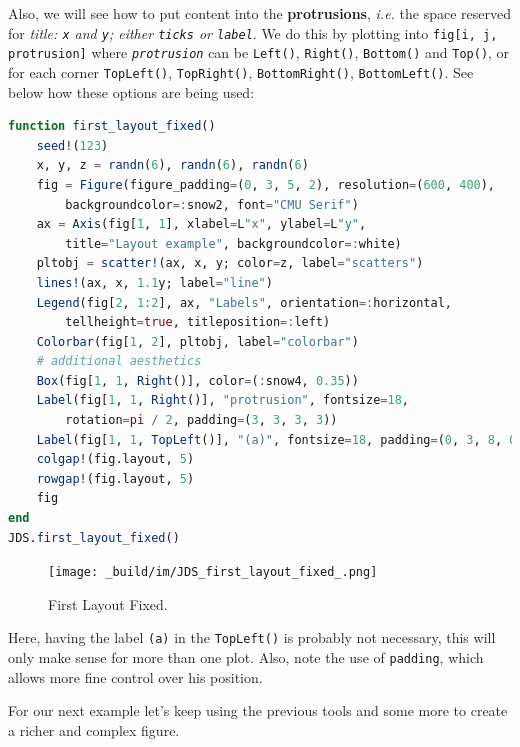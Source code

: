 \documentclass[
  notoc %
]{tufte-book}
\newcommand{\passthrough}[1]{#1}
\begin{document}
Also, we will see how to put content into the \textbf{protrusions},
\emph{i.e.} the space reserved for \emph{title:
\passthrough{\lstinline!x!} and \passthrough{\lstinline!y!}; either
\passthrough{\lstinline!ticks!} or \passthrough{\lstinline!label!}}. We
do this by plotting into \passthrough{\lstinline!fig[i, j, protrusion]!}
where \emph{\passthrough{\lstinline!protrusion!}} can be
\passthrough{\lstinline!Left()!}, \passthrough{\lstinline!Right()!},
\passthrough{\lstinline!Bottom()!} and \passthrough{\lstinline!Top()!},
or for each corner \passthrough{\lstinline!TopLeft()!},
\passthrough{\lstinline!TopRight()!},
\passthrough{\lstinline!BottomRight()!},
\passthrough{\lstinline!BottomLeft()!}. See below how these options are
being used:

\begin{lstlisting}[language=Julia]
function first_layout_fixed()
    seed!(123)
    x, y, z = randn(6), randn(6), randn(6)
    fig = Figure(figure_padding=(0, 3, 5, 2), resolution=(600, 400),
        backgroundcolor=:snow2, font="CMU Serif")
    ax = Axis(fig[1, 1], xlabel=L"x", ylabel=L"y",
        title="Layout example", backgroundcolor=:white)
    pltobj = scatter!(ax, x, y; color=z, label="scatters")
    lines!(ax, x, 1.1y; label="line")
    Legend(fig[2, 1:2], ax, "Labels", orientation=:horizontal,
        tellheight=true, titleposition=:left)
    Colorbar(fig[1, 2], pltobj, label="colorbar")
    # additional aesthetics
    Box(fig[1, 1, Right()], color=(:snow4, 0.35))
    Label(fig[1, 1, Right()], "protrusion", fontsize=18,
        rotation=pi / 2, padding=(3, 3, 3, 3))
    Label(fig[1, 1, TopLeft()], "(a)", fontsize=18, padding=(0, 3, 8, 0))
    colgap!(fig.layout, 5)
    rowgap!(fig.layout, 5)
    fig
end
JDS.first_layout_fixed()
\end{lstlisting}

\begin{figure}
\hypertarget{fig:first_layout_fixed}{%
\centering
\texttt{[image: \_build/im/JDS\_first\_layout\_fixed\_.png]}
\caption{First Layout Fixed.}\label{fig:first_layout_fixed}
}
\end{figure}

Here, having the label \passthrough{\lstinline!(a)!} in the
\passthrough{\lstinline!TopLeft()!} is probably not necessary, this will
only make sense for more than one plot. Also, note the use of
\passthrough{\lstinline!padding!}, which allows more fine control over
his position.

For our next example let's keep using the previous tools and some more
to create a richer and complex figure.
\end{document}
